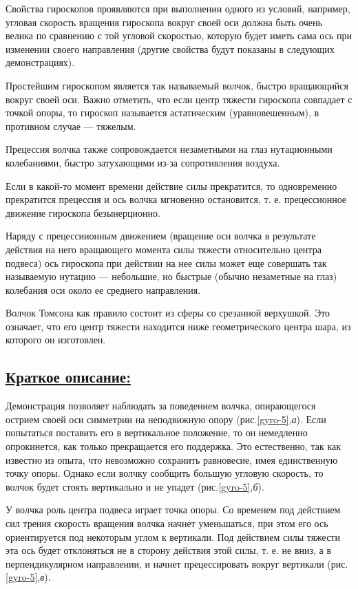 \documentclass[14pt,a4paper,oneside]{extarticle}	%
\begin{document}
Свойства гироскопов проявляются при выполнении одного из условий, например, угловая скорость вращения гироскопа вокруг своей оси должна быть очень велика по сравнению с той угловой скоростью, которую будет иметь сама ось при изменении своего направления (другие свойства будут показаны в следующих демонстрациях).
	
Простейшим гироскопом является так называемый волчок, быстро вращающийся вокруг своей оси.  
Важно отметить, что если центр тяжести гироскопа совпадает с точкой опоры, то гироскоп называется астатическим (уравновешенным), 
в противном случае — тяжелым.

Прецессия волчка также сопровождается незаметными на глаз нутационными колебаниями, быстро 
затухающими из-за сопротивления воздуха.

Если в какой-то момент времени действие силы прекратится, то одновременно прекратится прецессия и ось 
волчка мгновенно остановится, т. е. прецессионное движение гироскопа безынерционно.

Наряду с прецессиионным движением (вращение оси волчка в результате действия на него вращающего момента силы тяжести относительно центра подвеса) ось гироскопа при действии на нее силы может еще совершать так называемую нутацию — небольшие, 
но быстрые (обычно незаметные на глаз) колебания оси около ее среднего направления.

Волчок Томсона как правило состоит из сферы со срезанной верхушкой. 
Это означает, что его центр тяжести находится ниже геометрического центра шара, из которого он изготовлен. 

\newpage
	\subsection*{\underline{Краткое описание:}}
	
	Демонстрация позволяет наблюдать за поведением волчка, опирающегося острием своей оси симметрии на неподвижную опору (рис.\ref{gyro-5},\textit{а}).
	Если попытаться поставить его в вертикальное положение, то он немедленно опрокинется, как только прекращается его поддержка. 
	Это естественно, так как известно из опыта, что невозможно сохранить равновесие, имея единственную точку опоры.
	Однако если волчку сообщить большую угловую скорость, то волчок будет стоять вертикально и не упадет (рис.\ref{gyro-5},\textit{б}). 
	

У волчка роль центра подвеса играет точка опоры.
Со временем под действием сил трения скорость вращения волчка начнет уменьшаться, при этом его ось ориентируется под некоторым углом к вертикали.
Под действием силы тяжести эта ось будет отклоняться не в сторону действия этой силы, т. е. не вниз, а в перпендикулярном направлении, и начнет прецессировать вокруг вертикали (рис.\ref{gyro-5},\textit{в}).
\end{document}
